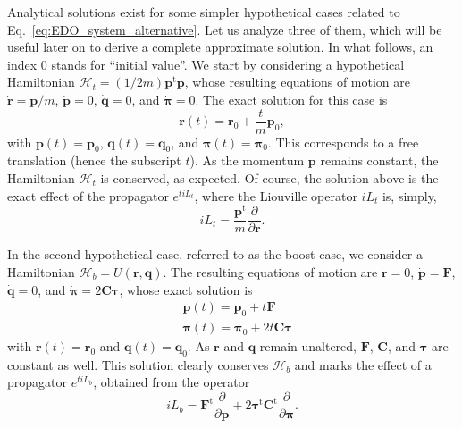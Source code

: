 \documentclass[aip,jcp,reprint,amsmath,amssymb]{revtex4-1}
\newcommand{\mt}[1]{\boldsymbol{\mathbf{#1}}}           %
\newcommand{\vt}[1]{\boldsymbol{\mathbf{#1}}}           %
\newcommand{\tr}[1]{#1^\text{t}}                        %
\newcommand{\diff}[2]{\dfrac{\partial #1}{\partial #2}} %
\begin{document}
Analytical solutions exist for some simpler hypothetical cases related to Eq.~\ref{eq:EDO_system_alternative}. Let us analyze three of them, which will be useful later on to derive a complete approximate solution. In what follows, an index $0$ stands for ``initial value''. We start by considering a hypothetical Hamiltonian $\mathcal{H}_t = (1/2m) \tr{\vt p} \vt p$, whose resulting equations of motion are $\dot{\vt r} = {\vt p}/m$, $\dot{\vt p} = 0$, $\dot{\vt q} = 0$, and $\dot{\vt \pi} = 0$. The exact solution for this case is
\[
{\vt r}(t) = {\vt r}_0 + \frac{t}{m} {\vt p}_0,
\]
with ${\vt p}(t) = {\vt p}_0$, ${\vt q}(t) = {\vt q}_0$, and ${\vt \pi}(t) = {\vt \pi}_0$. This corresponds to a free translation (hence the subscript $t$). As the momentum $\vt p$ remains constant, the Hamiltonian $\mathcal{H}_t$ is conserved, as expected. Of course, the solution above is the exact effect of the propagator $e^{t i\!L_t}$, where the Liouville operator $i\!L_t$ is, simply,
\[
i L_t = \frac{\tr{\vt p}}{m}\diff{}{\vt r}.
\]

In the second hypothetical case, referred to as the boost case, we consider a Hamiltonian $\mathcal{H}_b = U(\vt r, \vt q)$. The resulting equations of motion are $\dot{\vt r} = 0$, $\dot{\vt p} = \vt F$, $\dot{\vt q} = 0$, and $\dot{\vt \pi} = 2 \mt C \vt \tau$, whose exact solution is
\begin{align*}
&{\vt p}(t) = {\vt p}_0 + t \vt F \\
&{\vt \pi}(t) = {\vt \pi}_0 +  2 t \mt C \vt \tau
\end{align*}
with ${\vt r}(t) = {\vt r}_0$ and ${\vt q}(t) = {\vt q}_0$. As $\vt r$ and $\vt q$ remain unaltered, $\vt F$, $\mt C$, and $\vt \tau$ are constant as well. This solution clearly conserves $\mathcal{H}_b$ and marks the effect of a propagator $e^{t i\!L_b}$, obtained from the operator
\[
i\!L_b = \tr{\vt F} \diff{}{\vt p} + 2 \tr{\vt \tau} \tr{\mt C} \diff{}{\vt \pi}.
\]
\end{document}
